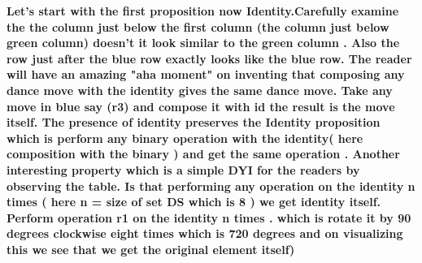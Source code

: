 \documentclass{article}
\begin{document}
\pagebreak
\begin{figure}
    \centering
\end{figure}
\textbf {Let's start with the first proposition now Identity.Carefully examine the the column just below the first column (the column just below green column) doesn't it look similar to the green column . Also the row just after the blue row exactly looks like the blue row. The reader will have an amazing "aha moment" on inventing that composing any dance move with the identity gives the same dance move. Take any move in blue say (r3) and compose it with id the result is the move itself. The presence of identity 
    preserves the Identity proposition which is perform any binary operation with the identity( here composition with the binary ) and get the same operation . Another interesting property which is a simple DYI for the readers by observing the table. Is that performing any operation on the identity n times ( here n = size of set DS which is 8 ) we get identity itself. Perform operation r1 on the identity n times . which is rotate it by 90 degrees clockwise eight times which is 720 degrees and on visualizing this we see that 
we get the original element itself)}
\end{document}
